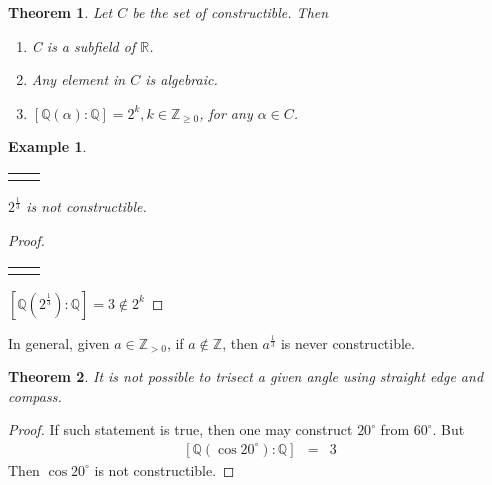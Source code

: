 \documentclass{article}
\theoremstyle{MyNonumberplain}
\theoremstyle{break}
\newtheorem*{proof}{Proof. }
\newcommand{\nline}{\begin{tabular}{ll}&\\\end{tabular}}
\newcommand{\nin}{\not\in}
\theoremstyle{break}
\newtheorem{theorem}{Theorem}[section]
\newtheorem{example}{Example}[section]
\theoremstyle{break}
\theoremstyle{definition}
\theoremstyle{break}
\begin{document}
\begin{thmbox}
    \begin{theorem}
        Let $C$ be the set of constructible. Then\\

        \begin{enumerate}
            \item C is a subfield of $\mathbb{R}$.\bigskip
            \item Any element in $C$ is algebraic.\bigskip
            \item $[\mathbb{Q} (\alpha) : \mathbb{Q}] = 2^k, k \in \mathbb{Z}_{\geq 0}$, for
            any $\alpha \in C$.
        \end{enumerate}
    \end{theorem}
\end{thmbox}

\begin{expbox}
    \begin{example}
        \nline

        $2^{\frac{1}{3}}$ is not constructible.
    \end{example}
    \begin{prfbox}
        \begin{proof}

            \nline

            $\left[ \mathbb{Q} \left( 2^{\frac{1}{3}} \right) : \mathbb{Q} \right] = 3
            \nin 2^k$
        \end{proof}
    \end{prfbox}
    In general, given $a \in \mathbb{Z}_{> 0}$, if $a \nin \mathbb{Z}$, then
$a^{\frac{1}{3}}$ is never constructible.
\end{expbox}

\begin{thmbox}
    \begin{theorem}
        It is not possible to trisect a given angle using straight edge and compass.
    \end{theorem}
    \begin{prfbox}
        \begin{proof}
            If such statement is true, then one may construct $20^{\circ}$ from
            $60^{\circ}$. But
            \begin{eqnarray*}
              {}[\mathbb{Q} (\cos 20^{\circ}) : \mathbb{Q}] & = & 3
            \end{eqnarray*}
            Then $\cos 20^{\circ}$ is not constructible.
        \end{proof}
    \end{prfbox}
\end{thmbox}
\end{document}
